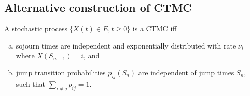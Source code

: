 \documentclass[a4paper,10pt,english]{article}
\begin{document}
\subsection{Alternative construction of CTMC}
\begin{prop} A stochastic process $\{X(t) \in E, t \geqslant 0 \}$ is a CTMC iff 
\begin{enumerate}[a.]
\item sojourn times are independent and exponentially distributed with rate $\nu_i$ where $X(S_{n-1}) = i$, and 
\item jump transition probabilities $p_{ij}(S_n)$ are independent of jump times $S_n$, such that $\sum_{i \neq j}p_{ij}=1$.
\end{enumerate}
\end{prop}
\end{document}
